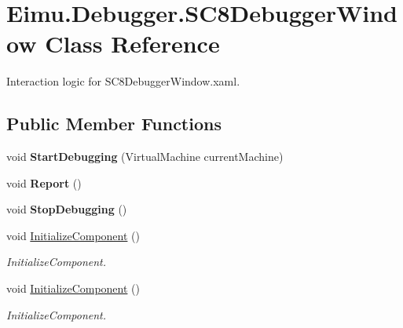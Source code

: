 \hypertarget{class_eimu_1_1_debugger_1_1_s_c8_debugger_window}{
\section{Eimu.Debugger.SC8DebuggerWindow Class Reference}
\label{class_eimu_1_1_debugger_1_1_s_c8_debugger_window}
}


Interaction logic for SC8DebuggerWindow.xaml.  


\subsection*{Public Member Functions}
\begin{DoxyCompactItemize}
\item 
\hypertarget{class_eimu_1_1_debugger_1_1_s_c8_debugger_window_abc674c1628002944d5023fdcb58ba39a}{
void {\bfseries StartDebugging} (VirtualMachine currentMachine)}
\label{class_eimu_1_1_debugger_1_1_s_c8_debugger_window_abc674c1628002944d5023fdcb58ba39a}

\item 
\hypertarget{class_eimu_1_1_debugger_1_1_s_c8_debugger_window_a53a69e85d26971bc9d017e4c9448e35f}{
void {\bfseries Report} ()}
\label{class_eimu_1_1_debugger_1_1_s_c8_debugger_window_a53a69e85d26971bc9d017e4c9448e35f}

\item 
\hypertarget{class_eimu_1_1_debugger_1_1_s_c8_debugger_window_a6c6782bbbd196ebfeef0629b17f87444}{
void {\bfseries StopDebugging} ()}
\label{class_eimu_1_1_debugger_1_1_s_c8_debugger_window_a6c6782bbbd196ebfeef0629b17f87444}

\item 
void \hyperlink{class_eimu_1_1_debugger_1_1_s_c8_debugger_window_a93d451532ee26cee1ebad1377c04560d}{InitializeComponent} ()
\begin{DoxyCompactList}\small\item\em InitializeComponent. \item\end{DoxyCompactList}\item 
void \hyperlink{class_eimu_1_1_debugger_1_1_s_c8_debugger_window_a93d451532ee26cee1ebad1377c04560d}{InitializeComponent} ()
\begin{DoxyCompactList}\small\item\em InitializeComponent. \item\end{DoxyCompactList}\end{DoxyCompactItemize}


